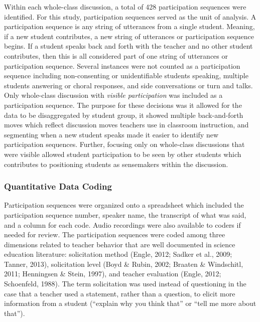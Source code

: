 \documentclass{sig-alternate} %
\begin{document}
\begin{large}
Within each whole-class discussion, a total of 428 participation sequences were identified. For this study, participation sequences served as the unit of analysis. A participation sequence is any string of utterances from a single student. Meaning, if a new student contributes, a new string of utterances or participation sequence begins. If a student speaks back and forth with the teacher and no other student contributes, then this is all considered part of one string of utterances or participation sequence. Several instances were not counted as a participation sequence including non-consenting or unidentifiable students speaking, multiple students answering or choral responses, and side conversations or turn and talks. Only whole-class discussion with \textit{visible participation} was included as a participation sequence. The purpose for these decisions was it allowed for the data to be disaggregated by student group, it showed multiple back-and-forth moves which reflect discussion moves teachers use in classroom instruction, and segmenting when a new student speaks made it easier to identify new participation sequences. Further, focusing only on whole-class discussions that were visible allowed student participation to be seen by other students which contributes to positioning students as sensemakers within the discussion. 

\subsubsection*{Quantitative Data Coding}

Participation sequences were organized onto a spreadsheet which included the participation sequence number, speaker name, the transcript of what was said, and a column for each code. Audio recordings were also available to coders if needed for review. The participation sequences were coded among three dimensions related to teacher behavior that are well documented in science education literature: solicitation method (Engle, 2012; Sadker et al., 2009; Tanner, 2013), solicitation level (Boyd \& Rubin, 2002; Braaten \& Windschitl, 2011; Henningsen \& Stein, 1997), and teacher evaluation (Engle, 2012; Schoenfeld, 1988). The term solicitation was used instead of questioning in the case that a teacher used a statement, rather than a question, to elicit more information from a student (“explain why you think that” or “tell me more about that”). 


\end{large}
\end{document}
